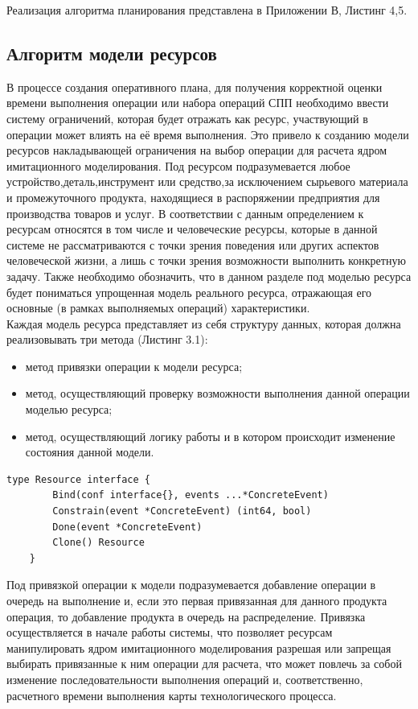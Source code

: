 Реализация алгоритма планирования представлена в Приложении В, Листинг 4,5.

\subsection{Алгоритм модели ресурсов}
\label{resource}

\indent В процессе создания оперативного плана, для получения корректной оценки времени выполнения операции или набора операций СПП необходимо ввести систему ограничений, которая будет отражать как ресурс, участвующий в операции может влиять на её время выполнения.
Это привело к созданию модели ресурсов накладывающей ограничения на выбор операции для расчета ядром имитационного моделирования.
Под ресурсом подразумевается любое устройство,деталь,инструмент или средство,за исключением сырьевого материала и промежуточного продукта, находящиеся в распоряжении предприятия для производства товаров и услуг.
В соответствии с данным определением к ресурсам относятся в том числе и человеческие ресурсы, которые в данной системе не рассматриваются с точки зрения поведения или других аспектов человеческой жизни, а лишь с точки зрения возможности выполнить конкретную задачу.
Также необходимо обозначить, что в данном разделе под моделью ресурса будет пониматься упрощенная модель реального ресурса, отражающая его основные (в рамках выполняемых операций) характеристики.\\
\indent Каждая модель ресурса представляет из себя структуру данных, которая должна реализовывать три метода (Листинг 3.1):
\begin{itemize}
	\item метод привязки операции к модели ресурса;
	\item метод, осуществляющий проверку возможности выполнения данной операции моделью ресурса;
	\item метод, осуществляющий логику работы и в котором происходит изменение состояния данной модели.
\end{itemize}

\begin{lstlisting}[language=Golang,caption={Описание методов ресурса},label=lst:code]
	type Resource interface {
		Bind(conf interface{}, events ...*ConcreteEvent)
		Constrain(event *ConcreteEvent) (int64, bool)
		Done(event *ConcreteEvent)
		Clone() Resource
	}
\end{lstlisting}

\indent Под привязкой операции к модели подразумевается добавление операции в очередь на выполнение и, если это первая привязанная для данного продукта операция, то добавление продукта в очередь на распределение. Привязка осуществляется в начале работы системы, что позволяет ресурсам манипулировать ядром имитационного моделирования разрешая или запрещая выбирать привязанные к ним операции для расчета, что может повлечь за собой изменение последовательности выполнения операций и, соответственно, расчетного времени выполнения карты технологического процесса.

